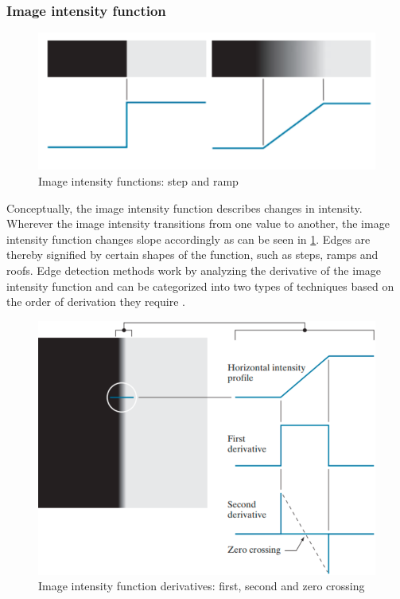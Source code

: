 \subsubsection*{Image intensity function}
\begin{figure}[h]
	\centerline{\includegraphics[scale=0.5]{images/edgeModel.png}}
	\caption{Image intensity functions: step and ramp \cite{gonzalezDigitalImageProcessing2007}}\label{fig:iif}
\end{figure}
\noindent
Conceptually, the image intensity function describes changes in intensity.
Wherever the image intensity transitions from one value to another,
the image intensity function changes slope accordingly as can be seen in \cref{fig:iif}.
Edges are thereby signified by certain shapes of the function, such as steps, ramps and roofs.
Edge detection methods work by analyzing the derivative of the image intensity function and
can be categorized into two types of techniques based on the order of derivation they require \cite{gonzalezDigitalImageProcessing2007}.
\begin{figure}[h]
	\centerline{\includegraphics[scale=0.5]{images/edgeModelOrders.png}}
	\caption{Image intensity function derivatives: first, second and zero crossing \cite{gonzalezDigitalImageProcessing2007}}\label{fig:iifO}
\end{figure}
\noindent

